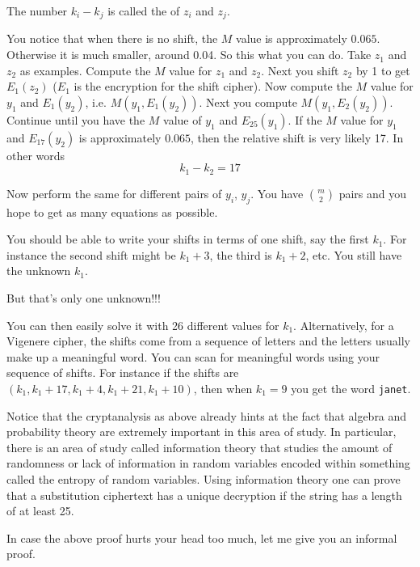 The number $k_i - k_j$ is called the
of $z_i$ and
$z_j$.



You notice that when there is no shift, the $M$ value is
approximately $0.065$. Otherwise it is much smaller, around 0.04.
So this what you can do. Take $z_1$ and $z_2$ as examples. Compute
the $M$ value for $z_1$ and $z_2$. Next you shift $z_2$ by 1 to
get $E_1(z_2)$ ($E_1$ is the encryption for the shift cipher). Now
compute the $M$ value for $y_1$ and $E_1(y_2)$, i.e. $M(y_1,
E_1(y_2))$. Next you compute $M(y_1, E_2(y_2))$. Continue until
you have the $M$ value of $y_1$ and $E_{25}(y_1)$. If the $M$
value for $y_1$ and $E_{17}(y_2)$ is approximately $0.065$, then
the relative shift is very likely 17. In other words
\[
  k_1 - k_2 = 17
\]

Now perform the same for different pairs of $y_i$, $y_j$. You have
$\binom{m}{2}$ pairs and you hope to get as many equations as
possible.

You should be able to write your shifts in terms of one shift, say
the first $k_1$. For instance the second shift might be $k_1+3$,
the third is $k_1+2$, etc. You still have the unknown $k_1$.

But that's only one unknown!!!

You can then easily solve it with 26
different values for $k_1$. Alternatively, for a Vigenere cipher,
the shifts come from a sequence of letters and the letters usually
make up a meaningful word. You can scan for meaningful words using
your sequence of shifts. For instance if the shifts are
$(k_1,k_1+17,k_1+4,k_1+21,k_1+10)$, then when $k_1=9$ you get the
word \texttt{janet}.

Notice that the cryptanalysis as above already hints at the fact
that algebra and probability theory are extremely important in
this area of study. In particular, there is an area of study
called information theory that studies the amount of randomness or
lack of information in random variables encoded within something
called the entropy of random variables.  Using information theory
one can prove that a substitution ciphertext has a unique
decryption if the string has a length of at least 25. 

In case the above proof hurts your head too much, let
me give you an informal proof.

